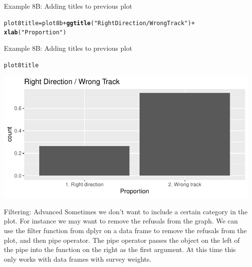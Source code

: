 \documentclass{beamer}\usepackage[]{graphicx}\usepackage[]{xcolor}
\makeatletter
\newcommand{\hlstr}[1]{\textcolor[rgb]{0.192,0.494,0.8}{#1}}%
\newcommand{\hlopt}[1]{\textcolor[rgb]{0,0,0}{#1}}%
\newcommand{\hlstd}[1]{\textcolor[rgb]{0.345,0.345,0.345}{#1}}%
\newcommand{\hlkwb}[1]{\textcolor[rgb]{0.69,0.353,0.396}{#1}}%
\newcommand{\hlkwd}[1]{\textcolor[rgb]{0.737,0.353,0.396}{\textbf{#1}}}%
\newenvironment{kframe}{%
 \def\at@end@of@kframe{}%
 \ifinner\ifhmode%
  \def\at@end@of@kframe{\end{minipage}}%
  \begin{minipage}{\columnwidth}%
 \fi\fi%
 \def\FrameCommand##1{\hskip\@totalleftmargin \hskip-\fboxsep
 \colorbox{shadecolor}{##1}\hskip-\fboxsep
     \hskip-\linewidth \hskip-\@totalleftmargin \hskip\columnwidth}%
 \MakeFramed {\advance\hsize-\width
   \@totalleftmargin\z@ \linewidth\hsize
   \@setminipage}}%
 {\par\unskip\endMakeFramed%
 \at@end@of@kframe}
\newenvironment{knitrout}{}{} %
\makeatother
\begin{document}
\begin{frame}[fragile]{Example 8B: Adding titles to previous plot}

\begin{knitrout}
\color{fgcolor}\begin{kframe}
\begin{alltt}
\hlstd{plot8title} \hlkwb{=} \hlstd{plot8b} \hlopt{+} \hlkwd{ggtitle}\hlstd{(}\hlstr{"Right Direction / Wrong Track"}\hlstd{)} \hlopt{+}
    \hlkwd{xlab}\hlstd{(}\hlstr{"Proportion"}\hlstd{)}
\end{alltt}
\end{kframe}
\end{knitrout}

\end{frame}
\begin{frame}[fragile]{Example 8B: Adding titles to previous plot}

\begin{knitrout}
\color{fgcolor}\begin{kframe}
\begin{alltt}
\hlstd{plot8title}
\end{alltt}
\end{kframe}
\includegraphics[width=0.95\linewidth]{figure/unnamed-chunk-49-1} 
\end{knitrout}

\end{frame}

\begin{frame}{Filtering: Advanced}
Sometimes we don't want to include a certain category in the plot.  For instance we may want to remove the refusals from the graph. We can use the filter  function from dplyr on a data frame to remove the refusals from the plot, and then pipe operator. The pipe operator passes the object on the left of the pipe into the function on the right as the first argument. At this time this only works with data frames with survey weights.
\end{frame}
\end{document}
